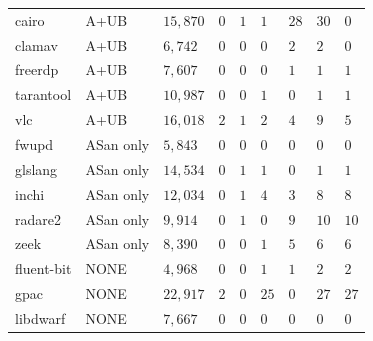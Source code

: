\begin{table}[h!]
{\begin{tabular}{|l|l|l|l|l|l|l|l|l|}
\hline
cairo            & A+UB                & $15,870$            & $0$              & $1$           & $1$           & $28$           & $30$            & $0$                 \\
clamav           & A+UB                & $6,742$             & $0$              & $0$           & $0$           & $2$            & $2$             & $0$                 \\
freerdp          & A+UB                & $7,607$             & $0$              & $0$           & $0$           & $1$            & $1$             & $1$                 \\
tarantool        & A+UB                & $10,987$            & $0$              & $0$           & $1$           & $0$            & $1$             & $1$                 \\
vlc              & A+UB                & $16,018$            & $2$              & $1$           & $2$           & $4$            & $9$             & $5$                 \\ 
\hline
fwupd            & ASan only                & $5,843$             & $0$              & $0$           & $0$           & $0$            & $0$             & $0$                 \\
glslang          & ASan only                & $14,534$            & $0$              & $1$           & $1$           & $0$            & $1$             & $1$                 \\
inchi            & ASan only                & $12,034$            & $0$              & $1$           & $4$           & $3$            & $8$             & $8$                 \\
radare2          & ASan only                & $9,914$             & $0$              & $1$           & $0$           & $9$            & $10$            & $10$                \\
zeek             & ASan only                & $8,390$             & $0$              & $0$           & $1$           & $5$            & $6$             & $6$                 \\ 
\hline
fluent-bit       & NONE                & $4,968$             & $0$              & $0$           & $1$           & $1$            & $2$             & $2$                 \\
gpac             & NONE                & $22,917$            & $2$         & $0$           & $25$          & $0$            & $27$            & $27$                \\
libdwarf         & NONE                & $7,667$             & $0$              & $0$           & $0$           & $0$            & $0$             & $0$                 \\

\end{tabular}}
\end{table}
